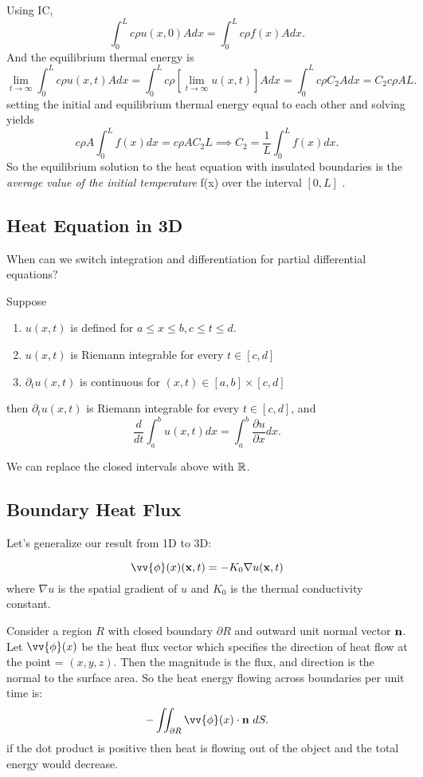 \documentclass[class=article,crop=false]{standalone}
\begin{document}
Using IC,
\[
	\int_{0}^{L}  c\rho u(x,0) A dx= \int_{0}^{L}  c\rho f(x) A dx
.\] 
And the equilibrium thermal energy is
\[
	\lim_{ t \to \infty} \int_{0}^{L}  c\rho u(x,t) A dx = \int_{0}^{L}  c\rho \left[ \lim_{ t \to \infty} u(x,t) \right] A dx = \int_{0}^{L}  c\rho C_2 A dx = C_2 c \rho AL
.\] 
setting the initial and equilibrium thermal energy equal to each other and solving yields
\[
	c\rho A \int_{0}^{L}  f(x) dx = c\rho A C_2 L \implies C_2 = \frac{1}{L} \int_{0}^{L} f(x) dx 
.\] 
So the equilibrium solution to the heat equation with insulated boundaries is the \emph{average value of the initial temperature} f(x) over the interval $ [0,L]$ . 

\subsection{Heat Equation in 3D}

When can we switch integration and differentiation for partial differential equations?
\begin{thm}[]
Suppose
\begin{enumerate}[label=\arabic*)]
	\item $ u(x,t)$ is defined for  $ a\leq x \leq b, c\leq t\leq d$.
	\item $u(x,t)$ is Riemann integrable for every  $ t \in [c,d]$
	\item $\partial_t u(x,t)$ is continuous for $ (x,t) \in [a,b] \times [c,d]$
\end{enumerate}
then $ \partial_t u(x,t)$ is Riemann integrable for every  $ t \in [c,d]$, and 
\[
	\frac{d }{d t} \int_{ a}^{ b} u(x,t) dx = \int_{ a}^{ b} \frac{\partial u}{\partial x} dx   
.\] 
\end{thm}
\begin{note}[]
We can replace the closed intervals above with $ \mathbb{R}$.
\end{note}
\subsection{Boundary Heat Flux}
Let's generalize our result from 1D to 3D:

\begin{thm}
\[
\vv{\phi}(x)(\allbold{x},t) = -K_0 \nabla u(\allbold{x},t)
\]
where $\nabla u$ is the spatial gradient of $u$ and $K_0$ is the thermal conductivity constant.
\end{thm}

Consider a region $R$ with closed boundary $\partial R$ and outward unit normal vector ${\boldmath\textbf{n}}$. Let $ \vv{\phi}(x)$ be the heat flux vector which specifies the direction of heat flow at the point = $ (x,y,z)$. Then the magnitude is the flux, and direction is the normal to the surface area. So the heat energy flowing across boundaries per unit time is:
 \[
	 -\iint_{\partial R} \vv{\phi}(x) \cdot \allbold{n} \ dS
.\] 
if the dot product is positive then heat is flowing out of the object and the total energy would decrease.
\end{document}

